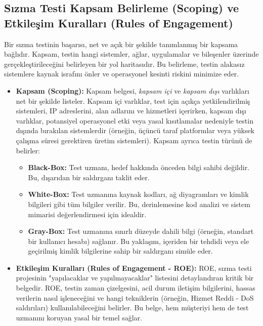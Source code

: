 \subsection{Sızma Testi Kapsam Belirleme (Scoping) ve Etkileşim Kuralları (Rules of Engagement)}

Bir sızma testinin başarısı, net ve açık bir şekilde tanımlanmış bir kapsama bağlıdır. Kapsam, testin hangi sistemler, ağlar, uygulamalar ve bileşenler üzerinde gerçekleştirileceğini belirleyen bir yol haritasıdır. Bu belirleme, testin alakasız sistemlere kaynak israfını önler ve operasyonel kesinti riskini minimize eder.

\begin{itemize}
\item \textbf{Kapsam (Scoping):} Kapsam belgesi, \textit{kapsam içi} ve \textit{kapsam dışı} varlıkları net bir şekilde listeler. Kapsam içi varlıklar, test için açıkça yetkilendirilmiş sistemleri, IP adreslerini, alan adlarını ve hizmetleri içerirken, kapsam dışı varlıklar, potansiyel operasyonel etki veya yasal kısıtlamalar nedeniyle testin dışında bırakılan sistemlerdir (örneğin, üçüncü taraf platformlar veya yüksek çalışma süresi gerektiren üretim sistemleri). Kapsam ayrıca testin türünü de belirler:
\begin{itemize}
\item \textbf{Black-Box:} Test uzmanı, hedef hakkında önceden bilgi sahibi değildir. Bu, dışarıdan bir saldırganı taklit eder.
\item \textbf{White-Box:} Test uzmanına kaynak kodları, ağ diyagramları ve kimlik bilgileri gibi tüm bilgiler verilir. Bu, derinlemesine kod analizi ve sistem mimarisi değerlendirmesi için idealdir.
\item \textbf{Gray-Box:} Test uzmanına sınırlı düzeyde dahili bilgi (örneğin, standart bir kullanıcı hesabı) sağlanır. Bu yaklaşım, içeriden bir tehdidi veya ele geçirilmiş kimlik bilgilerine sahip bir saldırganı simüle eder.
\end{itemize}
\item \textbf{Etkileşim Kuralları (Rules of Engagement - ROE):} ROE, sızma testi projesinin "yapılacaklar ve yapılmayacaklar" listesini detaylandıran kritik bir belgedir. ROE, testin zaman çizelgesini, acil durum iletişim bilgilerini, hassas verilerin nasıl işleneceğini ve hangi tekniklerin (örneğin, Hizmet Reddi - DoS saldırıları) kullanılabileceğini belirler. Bu belge, hem müşteriyi hem de test uzmanını koruyan yasal bir temel sağlar.
\end{itemize}

